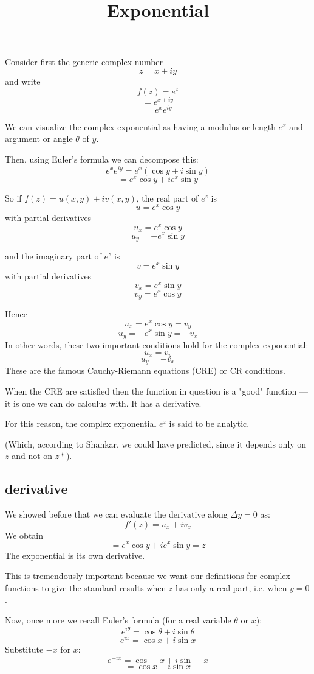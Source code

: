 \documentclass[11pt, oneside]{article}
\title{Exponential}
\date{}
\begin{document}
\maketitle
\Large

Consider first the generic complex number
\[ z = x + iy \]
and write
\[ f(z) = e^z \]
\[ = e^{x + iy} \]
\[ = e^x e^{iy} \]

We can visualize the complex exponential as having a modulus or length $e^x$ and argument or angle $\theta$ of $y$.

Then, using Euler's formula we can decompose this:
\[ e^x e^{iy} = e^x (\cos y + i \sin y) \]
\[ = e^x \cos y + i e^x \sin y \]

So if $f(z) = u(x,y) + i v(x,y)$, the real part of $e^z$ is 
\[ u = e^x \cos y \]
with partial derivatives
\[ u_x = e^x \cos y \]
\[ u_y = - e^x \sin y \]

and the imaginary part of $e^z$ is 
\[ v = e^x \sin y \]
with partial derivatives
\[ v_x = e^x \sin y \]
\[ v_y = e^x \cos y \]

Hence
\[ u_x = e^x \cos y = v_y \]
\[ u_y = - e^x \sin y = - v_x \]
In other words, these two important conditions hold for the complex exponential:
\[ u_x = v_y \]
\[ u_y = - v_x \]
These are the famous Cauchy-Riemann equations (CRE) or CR conditions.  

When the CRE are satisfied then the function in question is a "good" function --- it is one we can do calculus with.  It has a derivative.

For this reason, the complex exponential $e^z$ is said to be analytic. 

(Which, according to Shankar, we could have predicted, since it depends only on $z$ and not on $z*$).

\subsection*{derivative}

We showed before that we can evaluate the derivative along $\Delta y =0$ as:
\[ f'(z) = u_x + iv_x  \]
We obtain
\[ = e^x \cos y + i e^x \sin y = z \]
The exponential is its own derivative.

This is tremendously important because we want our definitions for complex functions to give the standard results when $z$ has only a real part, i.e. when $y=0$.

Now, once more we recall Euler's formula (for a real variable $\theta$ or $x$):
\[ e^{i \theta} = \cos \theta + i \sin \theta \]
\[ e^{i x} = \cos x + i \sin x \]
Substitute $-x$ for $x$:
\[ e^{-i x} = \cos -x + i \sin -x \]
\[ = \cos x - i \sin x \]
\end{document}
